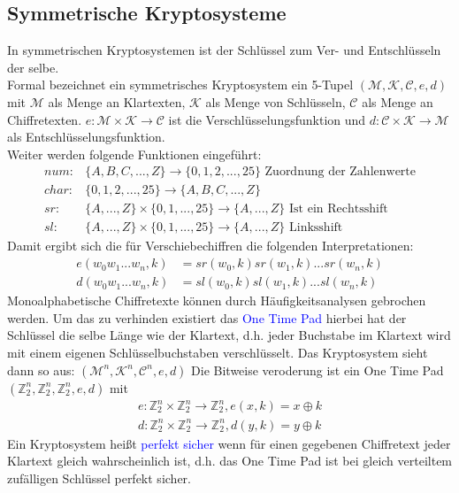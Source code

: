 \documentclass[a4paper,12pt,leqno]{article}
\newcommand{\blue}[1]{\textcolor{blue}{#1}}
\begin{document}
\subsection{Symmetrische Kryptosysteme}
In symmetrischen Kryptosystemen ist der Schlüssel zum Ver- und Entschlüsseln der selbe.\\
Formal bezeichnet ein symmetrisches Kryptosystem ein 5-Tupel $(\mathcal{M},\mathcal{K}, \mathcal{C},e,d)$ mit $\mathcal{M}$ als Menge an Klartexten, $\mathcal{K}$ als Menge von Schlüsseln, $\mathcal{C}$ als Menge an Chiffretexten.
$e: \mathcal{M}\times\mathcal{K}\rightarrow\mathcal{C}$ ist die Verschlüsselungsfunktion und $d: \mathcal{C}\times\mathcal{K}\rightarrow\mathcal{M}$ als Entschlüsselungsfunktion.\\
Weiter werden folgende Funktionen eingeführt:
\begin{align*}
num: & \{ A,B,C,...,Z\}\rightarrow\{ 0,1,2,...,25\} \textrm{ Zuordnung der Zahlenwerte}\\
char: & \{ 0,1,2,...,25\}\rightarrow\{ A,B,C,...,Z\}\\
sr: & \{A,...,Z\}\times\{0,1,...,25\}\rightarrow\{A,...,Z\} \textrm{ Ist ein Rechtsshift}\\
sl: & \{A,...,Z\}\times\{0,1,...,25\}\rightarrow\{A,...,Z\} \textrm{ Linksshift}
\end{align*}
Damit ergibt sich die für Verschiebechiffren die folgenden Interpretationen:
\begin{align*}
e(w_0w_1...w_n,k) &= sr(w_0,k)sr(w_1,k)...sr(w_n,k)\\
d(w_0w_1...w_n,k) &= sl(w_0,k)sl(w_1,k)...sl(w_n,k)
\end{align*}
Monoalphabetische Chiffretexte können durch Häufigkeitsanalysen gebrochen werden.
Um das zu verhinden existiert das \blue{One Time Pad} hierbei hat der Schlüssel die selbe Länge wie der Klartext, d.h. jeder Buchstabe im Klartext wird mit einem eigenen Schlüsselbuchstaben verschlüsselt. Das Kryptosystem sieht dann so aus: $(\mathcal{M}^n,\mathcal{K}^n, \mathcal{C}^n,e,d)$
Die Bitweise veroderung ist ein One Time Pad $(\mathbb{Z}_2^n,\mathbb{Z}_2^n,\mathbb{Z}_2^n,e,d)$ mit 
\begin{align*}
e:\mathbb{Z}_2^n\times\mathbb{Z}_2^n\rightarrow\mathbb{Z}_2^n,e(x,k)=x\oplus k\\
d:\mathbb{Z}_2^n\times\mathbb{Z}_2^n\rightarrow\mathbb{Z}_2^n,d(y,k)=y\oplus k
\end{align*}
Ein Kryptosystem heißt \blue{perfekt sicher} wenn für einen gegebenen Chiffretext jeder Klartext gleich wahrscheinlich ist, d.h. das One Time Pad ist bei gleich verteiltem zufälligen Schlüssel perfekt sicher.
\end{document}
